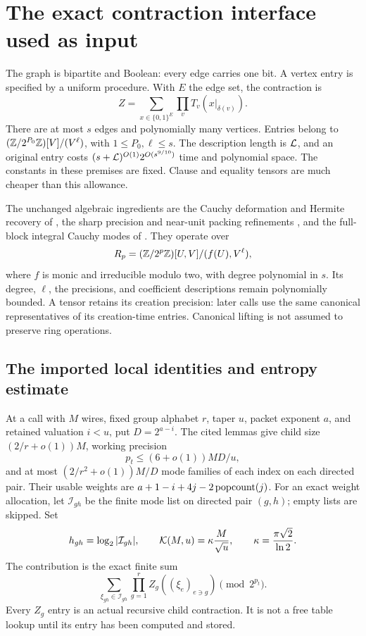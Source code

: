 \section{The exact contraction interface used as input}\label{sec:interface}

The graph is bipartite and Boolean: every edge carries one bit. A vertex
entry is specified by a uniform procedure. With $E$ the edge set, the
contraction is
\[
 Z=\sum_{x\in\{0,1\}^{E}}\prod_v T_v(x|_{\delta(v)}).
\]
There are at most $s$ edges and polynomially many vertices. Entries belong
to $(\mathbb Z/2^{P_0}\mathbb Z)[V]/(V^\ell)$, with $1\le P_0,\ell\le s$.
The description length is $\mathcal L$, and an original entry costs
$(s+\mathcal L)^{O(1)}2^{O(s^{9/10})}$ time and polynomial space. The
constants in these premises are fixed. Clause and equality tensors are
much cheaper than this allowance.

The unchanged algebraic ingredients are the Cauchy deformation and
Hermite recovery of \cite{source}, the sharp precision and near-unit
packing refinements \cite{precision,asymmetric}, and the full-block
integral Cauchy modes of \cite{joint}. They operate over
\[
 R_p=(\mathbb Z/2^p\mathbb Z)[U,V]/(f(U),V^\ell),
\]
where $f$ is monic and irreducible modulo two, with degree polynomial
in $s$. Its degree, $\ell$, the precisions, and coefficient descriptions
remain polynomially bounded. A tensor retains its creation precision:
later calls use the same canonical representatives of its creation-time
entries. Canonical lifting is not assumed to preserve ring operations.

\subsection{The imported local identities and entropy estimate}

At a call with $M$ wires, fixed group alphabet $r$, taper $u$, packet
exponent $a$, and retained valuation $i<u$, put $D=2^{a-i}$. The cited
lemmas give child size $(2/r+o(1))M$, working precision
\[
 p_t\le(6+o(1))MD/u,
\]
and at most $(2/r^2+o(1))M/D$ mode families of each index on each
directed pair. Their usable weights are
$a+1-i+4j-2\operatorname{popcount}(j)$. For an exact weight allocation, let
$\mathcal I_{gh}$ be the finite mode list on directed pair $(g,h)$;
empty lists are skipped. Set
\[
 h_{gh}=\log_2|\mathcal I_{gh}|,
 \qquad \mathcal K(M,u)=\kappa\frac M{\sqrt u},
 \qquad\kappa=\frac{\pi\sqrt2}{\ln2}.
\]
The contribution is the exact finite sum
\begin{equation}\label{eq:exact}
 \sum_{\xi_{gh}\in\mathcal I_{gh}}
       \prod_{g=1}^{r} Z_g((\xi_e)_{e\ni g})\pmod {2^{p_t}}.
\end{equation}
Every $Z_g$ entry is an actual recursive child contraction. It is not a
free table lookup until its entry has been computed and stored.

